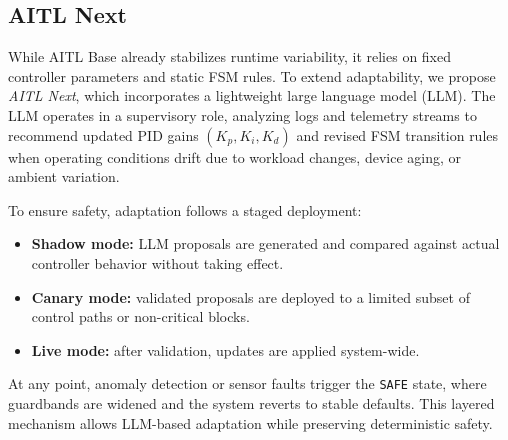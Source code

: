 \documentclass[conference]{IEEEtran}
\begin{document}
\subsection{AITL Next}
While AITL Base already stabilizes runtime variability, it relies on fixed controller parameters and static FSM rules. To extend adaptability, we propose \emph{AITL Next}, which incorporates a lightweight large language model (LLM). The LLM operates in a supervisory role, analyzing logs and telemetry streams to recommend updated PID gains $(K_p,K_i,K_d)$ and revised FSM transition rules when operating conditions drift due to workload changes, device aging, or ambient variation.

To ensure safety, adaptation follows a staged deployment:
\begin{itemize}
  \item \textbf{Shadow mode:} LLM proposals are generated and compared against actual controller behavior without taking effect.
  \item \textbf{Canary mode:} validated proposals are deployed to a limited subset of control paths or non-critical blocks.
  \item \textbf{Live mode:} after validation, updates are applied system-wide.
\end{itemize}
At any point, anomaly detection or sensor faults trigger the \texttt{SAFE} state, where guardbands are widened and the system reverts to stable defaults. This layered mechanism allows LLM-based adaptation while preserving deterministic safety.
\end{document}
